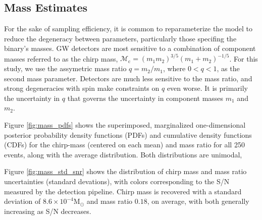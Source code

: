\subsection{Mass Estimates}

For the sake of sampling efficiency, it is common to reparameterize the model to reduce the degeneracy between parameters, particularly those specifing the binary's masses.  GW detectors are most sensitive to a combination of component masses referred to as the chirp mass, $\mathcal{M}_\mathrm{c} = (m_1 m_2)^{3/5} (m_1 + m_2)^{-1/5}$.  For this study, we use the assymetric mass ratio $q = m_2/m_1$, where $0 < q < 1$, as the second mass parameter.  Detectors are much less sensitive to the mass ratio, and strong degeneracies with spin make constraints on $q$ even worse.  It is primarily the uncertainty in $q$ that governs the uncertainty in component masses $m_1$ and $m_2$.

Figure \ref{fig:mass_pdfs} shows the superimposed, marginalized one-dimensional posterior probability density functions (PDFs) and cumulative density functions (CDFs) for the chirp-mass (centered on each mean) and mass ratio for all 250 events, along with the average distribution.  Both distributions are unimodal,

Figure \ref{fig:mass_std_snr} shows the distribution of chirp mass and mass ratio uncertainties (standard devations), with colors corresponding to the S/N measured by the detection pipeline.  Chirp mass is recovered with a standard deviation of $8.6 \times 10^{-4} \mathrm{M}_\odot$ and mass ratio $0.18$, on average, with both generally increasing as S/N decreases.